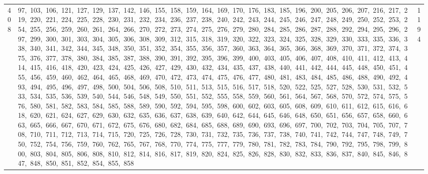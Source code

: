 \begin{longtable}{c|p{}|r}
408 & 97,\ 103,\ 106,\ 121,\ 127,\ 129,\ 137,\ 142,\ 146,\ 155,\ 158,\ 159,\ 164,\ 169,\ 170,\ 176,\ 183,\ 185,\ 196,\ 200,\ 205,\ 206,\ 207,\ 216,\ 217,\ 219,\ 220,\ 221,\ 224,\ 225,\ 228,\ 230,\ 231,\ 232,\ 234,\ 236,\ 237,\ 238,\ 240,\ 242,\ 243,\ 244,\ 245,\ 246,\ 247,\ 248,\ 249,\ 250,\ 252,\ 253,\ 254,\ 255,\ 256,\ 259,\ 260,\ 261,\ 264,\ 266,\ 270,\ 272,\ 273,\ 274,\ 275,\ 276,\ 279,\ 280,\ 284,\ 285,\ 286,\ 287,\ 288,\ 292,\ 294,\ 295,\ 296,\ 297,\ 299,\ 300,\ 301,\ 303,\ 304,\ 305,\ 306,\ 308,\ 309,\ 312,\ 315,\ 318,\ 319,\ 320,\ 322,\ 323,\ 324,\ 325,\ 328,\ 329,\ 330,\ 333,\ 335,\ 336,\ 338,\ 340,\ 341,\ 342,\ 344,\ 345,\ 348,\ 350,\ 351,\ 352,\ 354,\ 355,\ 356,\ 357,\ 360,\ 363,\ 364,\ 365,\ 366,\ 368,\ 369,\ 370,\ 371,\ 372,\ 374,\ 375,\ 376,\ 377,\ 378,\ 380,\ 384,\ 385,\ 387,\ 388,\ 390,\ 391,\ 392,\ 395,\ 396,\ 399,\ 400,\ 403,\ 405,\ 406,\ 407,\ 408,\ 410,\ 411,\ 412,\ 413,\ 414,\ 415,\ 416,\ 418,\ 420,\ 423,\ 424,\ 425,\ 426,\ 427,\ 429,\ 430,\ 432,\ 434,\ 435,\ 437,\ 438,\ 440,\ 441,\ 442,\ 444,\ 445,\ 448,\ 450,\ 451,\ 455,\ 456,\ 459,\ 460,\ 462,\ 464,\ 465,\ 468,\ 469,\ 470,\ 472,\ 473,\ 474,\ 475,\ 476,\ 477,\ 480,\ 481,\ 483,\ 484,\ 485,\ 486,\ 488,\ 490,\ 492,\ 493,\ 494,\ 495,\ 496,\ 497,\ 498,\ 500,\ 504,\ 506,\ 508,\ 510,\ 511,\ 513,\ 515,\ 516,\ 517,\ 518,\ 520,\ 522,\ 525,\ 527,\ 528,\ 530,\ 531,\ 532,\ 533,\ 534,\ 535,\ 536,\ 539,\ 540,\ 544,\ 546,\ 548,\ 549,\ 550,\ 551,\ 552,\ 555,\ 558,\ 559,\ 560,\ 561,\ 564,\ 567,\ 568,\ 570,\ 572,\ 574,\ 575,\ 576,\ 580,\ 581,\ 582,\ 583,\ 584,\ 585,\ 588,\ 589,\ 590,\ 592,\ 594,\ 595,\ 598,\ 600,\ 602,\ 603,\ 605,\ 608,\ 609,\ 610,\ 611,\ 612,\ 615,\ 616,\ 618,\ 620,\ 621,\ 624,\ 627,\ 629,\ 630,\ 632,\ 635,\ 636,\ 637,\ 638,\ 639,\ 640,\ 642,\ 644,\ 645,\ 646,\ 648,\ 650,\ 651,\ 656,\ 657,\ 658,\ 660,\ 663,\ 665,\ 666,\ 667,\ 670,\ 671,\ 672,\ 675,\ 676,\ 680,\ 682,\ 684,\ 685,\ 688,\ 689,\ 690,\ 693,\ 696,\ 697,\ 700,\ 702,\ 703,\ 704,\ 705,\ 707,\ 708,\ 710,\ 711,\ 712,\ 713,\ 714,\ 715,\ 720,\ 725,\ 726,\ 728,\ 730,\ 731,\ 732,\ 735,\ 736,\ 737,\ 738,\ 740,\ 741,\ 742,\ 744,\ 747,\ 748,\ 749,\ 750,\ 752,\ 754,\ 756,\ 759,\ 760,\ 762,\ 765,\ 767,\ 768,\ 770,\ 774,\ 775,\ 777,\ 779,\ 780,\ 781,\ 782,\ 783,\ 784,\ 790,\ 792,\ 795,\ 798,\ 799,\ 800,\ 803,\ 804,\ 805,\ 806,\ 808,\ 810,\ 812,\ 814,\ 816,\ 817,\ 819,\ 820,\ 824,\ 825,\ 826,\ 828,\ 830,\ 832,\ 833,\ 836,\ 837,\ 840,\ 845,\ 846,\ 847,\ 848,\ 850,\ 851,\ 852,\ 854,\ 855,\ 858 & 1194 \\

\end{longtable}
